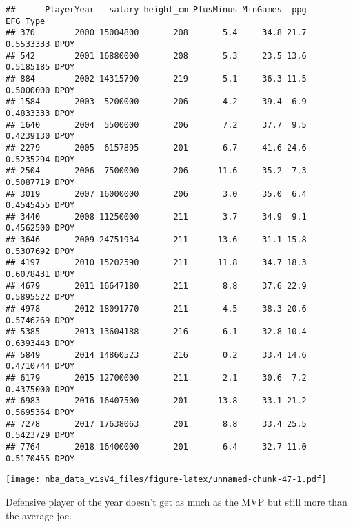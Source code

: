 \documentclass[]{article}
\begin{document}
\begin{verbatim}
##      PlayerYear   salary height_cm PlusMinus MinGames  ppg       EFG Type
## 370        2000 15004800       208       5.4     34.8 21.7 0.5533333 DPOY
## 542        2001 16880000       208       5.3     23.5 13.6 0.5185185 DPOY
## 884        2002 14315790       219       5.1     36.3 11.5 0.5000000 DPOY
## 1584       2003  5200000       206       4.2     39.4  6.9 0.4833333 DPOY
## 1640       2004  5500000       206       7.2     37.7  9.5 0.4239130 DPOY
## 2279       2005  6157895       201       6.7     41.6 24.6 0.5235294 DPOY
## 2504       2006  7500000       206      11.6     35.2  7.3 0.5087719 DPOY
## 3019       2007 16000000       206       3.0     35.0  6.4 0.4545455 DPOY
## 3440       2008 11250000       211       3.7     34.9  9.1 0.4562500 DPOY
## 3646       2009 24751934       211      13.6     31.1 15.8 0.5307692 DPOY
## 4197       2010 15202590       211      11.8     34.7 18.3 0.6078431 DPOY
## 4679       2011 16647180       211       8.8     37.6 22.9 0.5895522 DPOY
## 4978       2012 18091770       211       4.5     38.3 20.6 0.5746269 DPOY
## 5385       2013 13604188       216       6.1     32.8 10.4 0.6393443 DPOY
## 5849       2014 14860523       216       0.2     33.4 14.6 0.4710744 DPOY
## 6179       2015 12700000       211       2.1     30.6  7.2 0.4375000 DPOY
## 6983       2016 16407500       201      13.8     33.1 21.2 0.5695364 DPOY
## 7278       2017 17638063       201       8.8     33.4 25.5 0.5423729 DPOY
## 7764       2018 16400000       201       6.4     32.7 11.0 0.5170455 DPOY
\end{verbatim}

\texttt{[image: nba\_data\_visV4\_files/figure-latex/unnamed-chunk-47-1.pdf]}

Defensive player of the year doesn't get as much as the MVP but still
more than the average joe.
\end{document}
